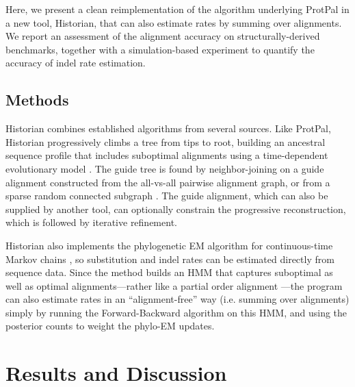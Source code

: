 \documentclass{bioinfo}
\begin{document}
Here, we present a clean reimplementation of the algorithm underlying ProtPal
in a new tool, Historian, that can also estimate rates by summing over alignments.
We report an assessment of the alignment accuracy
on structurally-derived benchmarks,
together with a simulation-based experiment to quantify the accuracy of indel rate estimation.

\begin{methods}
\section{Methods}

Historian combines established algorithms from several sources.
Like ProtPal, Historian progressively climbs a tree from tips to root,
building an ancestral sequence profile that includes suboptimal alignments \citep{LeeGrassoSharlow2002,Westesson2012-zg}
using a time-dependent evolutionary model \citep{RivasEddy2015}.
The guide tree is found by neighbor-joining %
on a guide alignment constructed from the all-vs-all pairwise alignment graph,
or from a sparse random connected subgraph \citep{BradleyEtAl2009}.
The guide alignment, which can also be supplied by another tool,
can optionally constrain the progressive reconstruction,
which is followed by iterative refinement. %

Historian also implements the phylogenetic EM algorithm for continuous-time Markov chains \citep{HolmesRubin2002},
so substitution and indel rates can be estimated directly from sequence data.
Since the method builds an HMM that captures suboptimal as well as optimal alignments---rather
like a partial order alignment \citep{LeeGrassoSharlow2002}---the program
can also estimate rates in an ``alignment-free'' way (i.e. summing over alignments)
simply by running the Forward-Backward algorithm on this HMM,
and using the posterior counts to weight the phylo-EM updates.

\end{methods}

\section{Results and Discussion}
\end{document}
